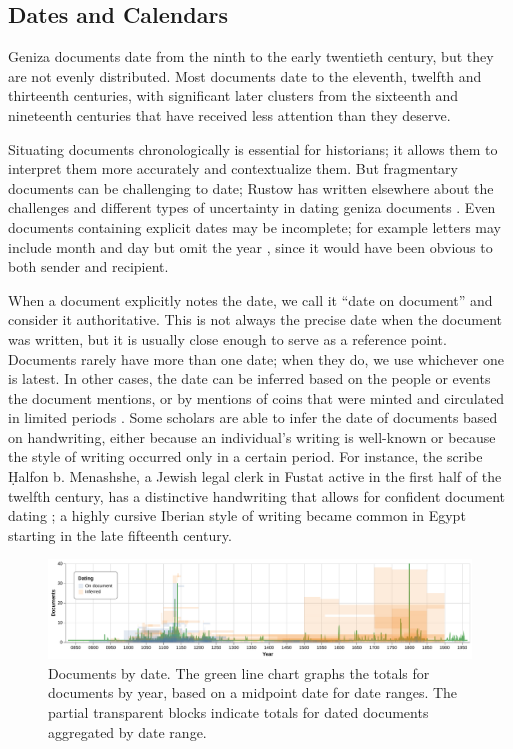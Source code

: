 \documentclass{article}
\begin{document}
\subsection{Dates and Calendars}

Geniza documents date from the ninth to the early twentieth century, but they are not evenly distributed. Most documents date to the eleventh, twelfth and thirteenth centuries, with significant later clusters from the sixteenth and nineteenth centuries that have received less attention than they deserve.

Situating documents chronologically is essential for historians; it allows them to interpret them more accurately and contextualize them. But fragmentary documents can be challenging to date; Rustow has written elsewhere about the challenges and different types of uncertainty in dating geniza documents \autocite{rustow_dating_nodate}. Even documents containing explicit dates may be incomplete; for example letters may include month and day but omit the year , since it would have been obvious to both sender and recipient. 

When a document explicitly notes the date, we call it “date on document” and consider it authoritative. This is not always the precise date when the document was written, but it is usually close enough to serve as a reference point. Documents rarely have more than one date; when they do, we use whichever one is latest. In other cases, the date can be inferred based on the people or events the document mentions, or by mentions of coins that were minted and circulated in limited periods \autocite{dudley_coins_2023}. Some scholars are able to infer the date of documents based on handwriting, either because an individual’s writing is well-known or because the style of writing occurred only in a certain period. For instance, the scribe Ḥalfon b. Menashshe, a Jewish legal clerk in Fustat active in the first half of the twelfth century, has a distinctive handwriting that allows for confident document dating \autocite{elbaum_halfon_nodate}; a highly cursive Iberian style of writing became common in Egypt starting in the late fifteenth century.

\begin{figure}[!hbt]
  \centering
  \includegraphics[width=\textwidth]{charts/combined_dating.pdf}
  \caption{Documents by date. The green line chart graphs the totals for documents by year, based on a midpoint date for date ranges. The partial transparent blocks indicate totals for dated documents aggregated by date range.}
  \label{fig:docs_dating_combined}
\end{figure}
\end{document}
